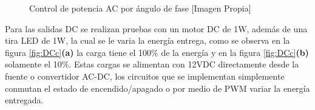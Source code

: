 \begin{figure}[!t]
	\centering
	\caption{Control de potencia AC por ángulo de fase [Imagen Propia]}
	\label{fig:ACc}
\end{figure}

Para las salidas DC se realizan pruebas con un motor DC de 1W, además de una tira LED de 1W, la cual se le varia la energía entrega, como se observa en la figura \ref{fig:DCc}\textbf{(a)} la carga tiene el 100\% de la energía y en la figura \ref{fig:DCc}\textbf{(b)} solamente el 10\%. Estas cargas se alimentan con 12VDC directamente desde la fuente o convertidor AC-DC, los circuitos que se implementan simplemente conmutan el estado de encendido/apagado o por medio de PWM variar la energía entregada.\\

